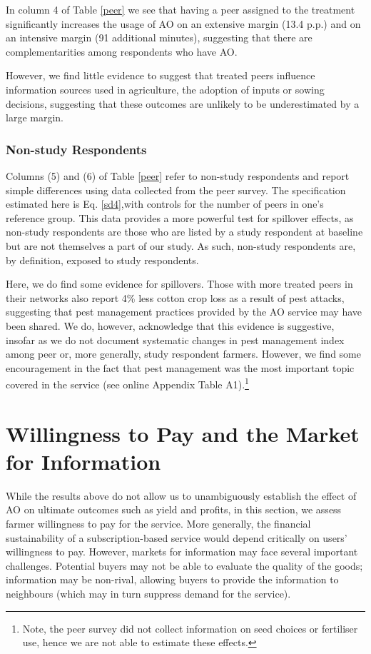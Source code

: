 \documentclass[12pt]{article}
\begin{document}
In column 4 of Table \ref{peer} we see that having a peer assigned to the treatment significantly increases the usage of AO on an extensive margin (13.4 p.p.) and on an intensive margin (91 additional minutes), suggesting that there are complementarities among respondents who have AO. 

However, we find little evidence to suggest that treated peers influence information sources used in agriculture, the adoption of inputs or sowing decisions, suggesting that these outcomes are unlikely to be underestimated by a large margin.


\subsubsection{\protect\normalsize Non-study Respondents}

{\normalsize Columns (5) and (6) of Table \ref{peer} refer to non-study respondents and report
simple differences using data collected from the peer survey. The
specification estimated here is Eq. \eqref{sd4},with controls for the number
of peers in one's reference group. This data provides a more powerful test for spillover effects, as non-study respondents are those who are listed by a study respondent at baseline but are not themselves a part of our study. As such, non-study respondents are, by definition, exposed to study respondents.}

{\normalsize Here, we do find some evidence for spillovers. Those with more treated peers in their networks also report 4\% less cotton crop loss as a result of pest attacks, suggesting that pest management practices provided by the AO service may have been shared. We do, however, acknowledge that this evidence is suggestive, insofar as we do not document systematic changes in pest management index among peer or, more generally, study respondent farmers. However, we find some encouragement in the fact that pest management was the most important topic covered in the service (see online Appendix Table A1).\footnote{Note, the peer survey did not collect information on seed choices or fertiliser use, hence we are not able to estimate these effects.}}

\section{\protect\normalsize Willingness to Pay and the Market for Information}

While the results above do not allow us to unambiguously establish the effect of AO on ultimate outcomes such as yield and profits, in this section, we assess farmer willingness to pay for the service. More generally, the financial sustainability of a subscription-based service would depend critically on users' willingness to pay. However, markets for information may face several important challenges. Potential buyers may not be able to evaluate the quality of the goods; information may be non-rival, allowing buyers to provide the information to neighbours (which may in turn suppress demand for the service). 
\end{document}
